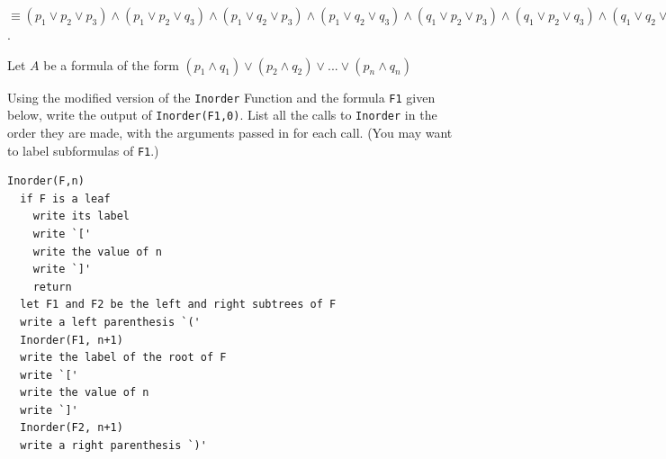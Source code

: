 \documentclass[]{exam}
\begin{document}
\begin{questions}
\begin{parts}
\begin{solution}
$\equiv (p_1 \lor p_2 \lor p_3) \land (p_1 \lor p_2 \lor q_3) 
  \land (p_1 \lor q_2 \lor p_3) \land (p_1 \lor q_2 \lor q_3) 
  \land (q_1 \lor p_2 \lor p_3) \land (q_1 \lor p_2 \lor q_3) 
  \land (q_1 \lor q_2 \lor p_3) \land (q_1 \lor q_2 \lor q_3)$.


\end{solution}
\end{parts}

\question Let $A$ be a formula of the form $(p_1 \land q_1) \lor (p_2 \land
    q_2)\lor ...\lor (p_n \land q_n)$
\question  Using the modified version of the \texttt{Inorder} Function and
the formula \texttt{F1} given below, write the output of \texttt{Inorder(F1,0)}.
List all the calls to \texttt{Inorder} in the order they are made, with the
arguments passed in for each call. (You may want to label subformulas of
\texttt{F1}.)
\begin{verbatim}
Inorder(F,n)
  if F is a leaf
    write its label
    write `['
    write the value of n
    write `]'
    return
  let F1 and F2 be the left and right subtrees of F
  write a left parenthesis `('
  Inorder(F1, n+1)
  write the label of the root of F
  write `['
  write the value of n
  write `]'
  Inorder(F2, n+1)
  write a right parenthesis `)'
\end{verbatim}


\end{questions}
\end{document}
